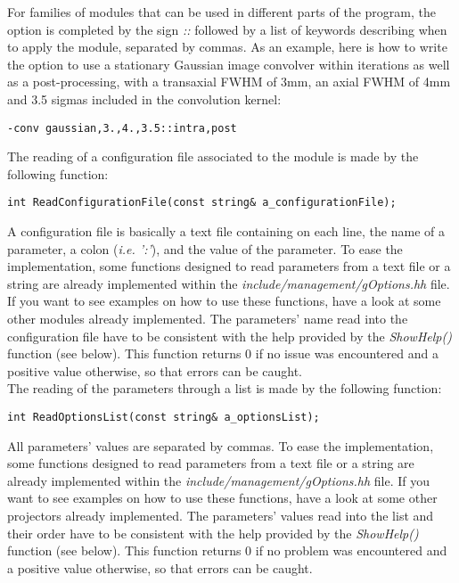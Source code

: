 \documentclass[a4paper, 11pt]{article}
\begin{document}
For families of modules that can be used in different parts of the program, the option is completed by the sign \textit{::} followed by a list of keywords describing when to apply the module, separated by commas.
As an example, here is how to write the option to use a stationary Gaussian image convolver within iterations as well as a post-processing, with a transaxial FWHM of 3mm, an axial FWHM of 4mm and 3.5 sigmas included in the convolution kernel:

\begin{lstlisting}[label={},caption={A command line option to use a gaussian convolver within iterations as well as a post-processing, with a transaxial FWHM of 3mm, an axial FWHM of 4mm and 3.5 sigmas included in the convolution kernel.}]
-conv gaussian,3.,4.,3.5::intra,post
\end{lstlisting}

The reading of a configuration file associated to the module is made by the following function:
\begin{lstlisting}[label={ReadConfigurationFile},caption=Function to read a configuration file for your module.]
int ReadConfigurationFile(const string& a_configurationFile);
\end{lstlisting}

A configuration file is basically a text file containing on each line, the name of a parameter, a colon (\textit{i.e. ':'}), and the value of the parameter.
To ease the implementation, some functions designed to read parameters from a text file or a string are already implemented within the \textit{include/management/gOptions.hh}
file.
If you want to see examples on how to use these functions, have a look at some other modules already implemented.
The parameters' name read into the configuration file have to be consistent with the help provided by the \textit{ShowHelp()} function (see below).
This function returns 0 if no issue was encountered and a positive value otherwise, so that errors can be caught.\\

The reading of the parameters through a list is made by the following function:
\begin{lstlisting}[label={ReadOptionsList},caption=Function to read a list of options for your module.]
int ReadOptionsList(const string& a_optionsList);
\end{lstlisting}

All parameters' values are separated by commas.
To ease the implementation, some functions designed to read parameters from a text file or a string are already implemented within the \textit{include/management/gOptions.hh} file.
If you want to see examples on how to use these functions, have a look at some other projectors already implemented.
The parameters' values read into the list and their order have to be consistent with the help provided by the \textit{ShowHelp()} function (see below).
This function returns 0 if no problem was encountered and a positive value otherwise, so that errors can be caught.\\
\end{document}
